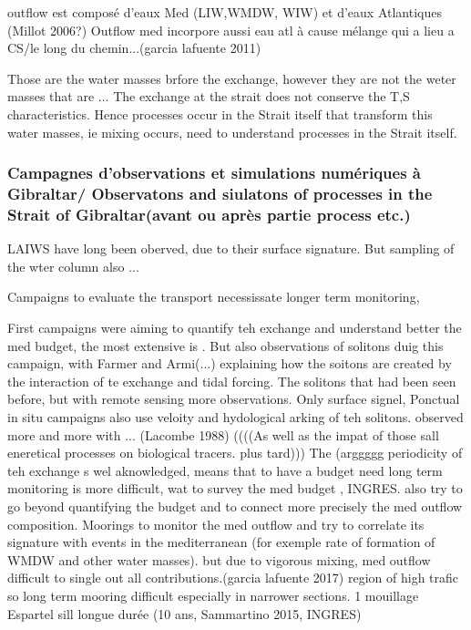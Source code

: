 outflow est composé d’eaux Med (LIW,WMDW, WIW) et d’eaux Atlantiques (Millot 2006?)
Outflow med incorpore aussi eau atl à cause mélange qui a lieu a CS/le long du chemin...(garcia lafuente 2011)   

Those are the water masses brfore the exchange, however they are not the weter masses that are ... The exchange at the strait does not conserve the T,S characteristics. Hence processes occur in the Strait itself that transform this water masses, ie mixing occurs, need to understand processes in the Strait itself.

\subsubsection{Campagnes d'observations et simulations numériques à Gibraltar/ Observatons and siulatons of processes in the Strait of Gibraltar(avant ou après partie process etc.)}

LAIWS have long been oberved, due to their surface signature.   But sampling of the wter column also ...

Campaigns to evaluate the transport necessissate longer term monitoring, 

First campaigns were aiming to quantify teh exchange and understand better the med budget, the most extensive is  . But also observations of solitons duig this campaign, with Farmer and Armi(...) explaining how the soitons are created by the interaction of te exchange and tidal forcing. The solitons that had been seen before, but with remote sensing more observations. Only surface signel, Ponctual in situ campaigns also use veloity and hydological arking of teh solitons. observed more and more with ... (Lacombe 1988) ((((As well as the impat of those sall eneretical processes on biological tracers. plus tard)))
The (arggggg periodicity of teh exchange s wel aknowledged, means that to have a budget need long term monitoring is more difficult, wat to survey the med budget , INGRES. also try to go beyond quantifying the budget and to connect more precisely the med outflow composition.
Moorings to monitor the med outflow and try to correlate its signature with events in the mediterranean (for exemple rate of formation of WMDW and other water masses). but due to vigorous mixing, med outflow difficult to single out all contributions.(garcia lafuente 2017) region of high trafic so long term mooring difficult especially in narrower sections. 1 mouillage Espartel sill longue durée (10 ans, Sammartino 2015, INGRES)

